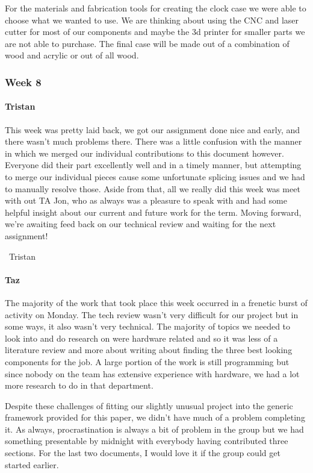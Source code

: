 \documentclass[onecolumn, draftclsnofoot,10pt, compsoc]{IEEEtran}
\begin{document}
For the materials and fabrication tools for creating the clock case we were able to choose what we wanted to use. We are thinking about using the CNC and laser cutter for most of our components and maybe the 3d printer for smaller parts we are not able to purchase. The final case will be made out of a combination of wood and acrylic or out of all wood.
\subsubsection{Week 8}
\paragraph{Tristan}
This week was pretty laid back, we got our assignment done nice and early, and there wasn't much problems there. There was a little confusion with the manner in which we merged our individual contributions to this document however. Everyone did their part excellently well and in a timely manner, but attempting to merge our individual pieces cause some unfortunate splicing issues and we had to manually resolve those. Aside from that, all we really did this week was meet with out TA Jon, who as always was a pleasure to speak with and had some helpful insight about our current and future work for the term. Moving forward, we're awaiting feed back on our technical review and waiting for the next assignment!

~Tristan
\paragraph{Taz}
The majority of the work that took place this week occurred in a frenetic burst of activity on Monday. The tech review wasn't very difficult for our project but in some ways, it also wasn't very technical. The majority of topics we needed to look into and do research on were hardware related and so it was less of a literature review and more about writing about finding the three best looking components for the job. A large portion of the work is still programming but since nobody on the team has extensive experience with hardware, we had a lot more research to do in that department.

Despite these challenges of fitting our slightly unusual project into the generic framework provided for this paper, we didn't have much of a problem completing it. As always, procrastination is always a bit of problem in the group but we had something presentable by midnight with everybody having contributed three sections. For the last two documents, I would love it if the group could get started earlier.
\end{document}

